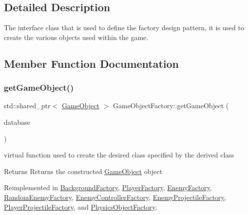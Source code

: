 \subsection{Detailed Description}
The interface class that is used to define the factory design pattern, it is used to create the various objects used within the game. 

\subsection{Member Function Documentation}
\mbox{\label{class_game_object_factory_a5b684a6e77fb82c041f1721eb07c553d}} 
\subsubsection{\texorpdfstring{get\+Game\+Object()}{getGameObject()}}
{\footnotesize\ttfamily std\+::shared\+\_\+ptr$<$ \hyperlink{class_game_object}{Game\+Object} $>$ Game\+Object\+Factory\+::get\+Game\+Object (\begin{DoxyParamCaption}\item[{const std\+::shared\+\_\+ptr$<$ \hyperlink{class_database_interface}{Database\+Interface} $>$ \&}]{database }\end{DoxyParamCaption})\hspace{0.3cm}{\ttfamily [virtual]}}



virtual function used to create the desired class specified by the derived class 

\begin{DoxyReturn}{Returns}
Returns the constructed \hyperlink{class_game_object}{Game\+Object} object 
\end{DoxyReturn}


Reimplemented in \hyperlink{class_background_factory_a17793b3ec704137388b70f53361691c3}{Background\+Factory}, \hyperlink{class_player_factory_ab92534e7d2d6887ecf9e4ed8131a8112}{Player\+Factory}, \hyperlink{class_enemy_factory_acb6ad18d5ef69a27927907fa9a444c7d}{Enemy\+Factory}, \hyperlink{class_random_enemy_factory_a5099fcf010a5cf2f53fd7c874a1925a9}{Random\+Enemy\+Factory}, \hyperlink{class_enemy_controller_factory_a6ab6c433cc498c7353a1ab2eb213664d}{Enemy\+Controller\+Factory}, \hyperlink{class_enemy_projectile_factory_a081c6bea7032956c278fdf4ff62d530a}{Enemy\+Projectile\+Factory}, \hyperlink{class_player_projectile_factory_a804a9f591ce6f0a7fb04f35ff685ff57}{Player\+Projectile\+Factory}, and \hyperlink{class_physics_object_factory_a2644107d0c455c3307559cd824a7c9a8}{Physics\+Object\+Factory}.

